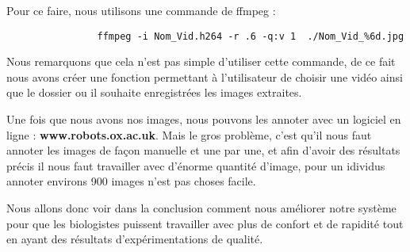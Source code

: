 \begin{flushleft}
            Pour ce faire, nous utilisons une commande de ffmpeg :
            
            \begin{verbatim}
                ffmpeg -i Nom_Vid.h264 -r .6 -q:v 1  ./Nom_Vid_%6d.jpg
            \end{verbatim}

            Nous remarquons que cela n'est pas simple d'utiliser cette commande, de ce fait nous avons créer une fonction permettant à l'utilisateur de choisir une vidéo ainsi que le dossier ou il souhaite enregistrées les images extraites.

            \vspace{0.2cm}

            Une fois que nous avons nos images, nous pouvons les annoter avec un logiciel en ligne : \textbf{www.robots.ox.ac.uk}.
            Mais le gros problème, c'est qu'il nous faut annoter les images de façon manuelle et une par une, et afin d'avoir des résultats précis il nous faut travailler avec d'énorme quantité d'image, pour un idividus annoter environs 900 images n'est pas choses facile.

            \vspace{0.2cm}

            Nous allons donc voir dans la conclusion comment nous améliorer notre système pour que les biologistes puissent travailler avec plus de confort et de rapidité tout en ayant des résultats d'expérimentations de qualité.
        \end{flushleft}
